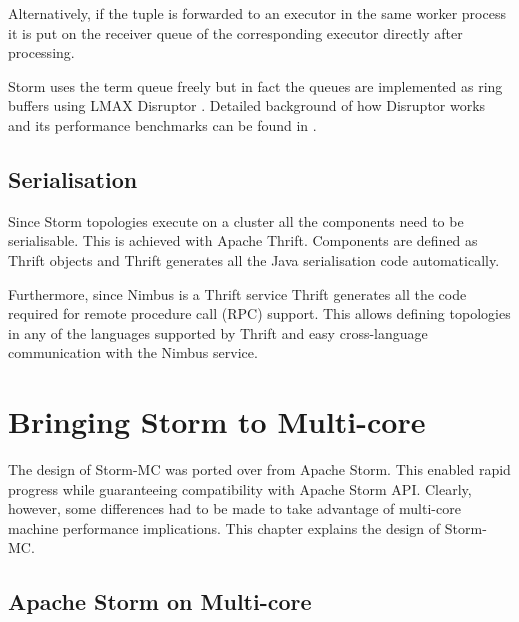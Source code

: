 \documentclass[bsc,logo,frontabs,twoside,singlespacing,normalheadings,parskip]{infthesis}     %
\let\Oldtodo\todo
\renewcommand{\todo}[1]{\Oldtodo[inline]{#1}}
\begin{document}
Alternatively, if the tuple is forwarded to an executor in the same worker process it is put on the receiver queue of the corresponding executor directly after processing.

Storm uses the term queue freely but in fact the queues are implemented as ring buffers using LMAX Disruptor \cite{LMAX_Disruptor}. Detailed background of how Disruptor works and its performance benchmarks can be found in \cite{Thompson_Farley_Barker_Gee_Stewart_2011}.

\section{Serialisation}
\label{sec:serialisation}

Since Storm topologies execute on a cluster all the components need to be serialisable. This is achieved with Apache Thrift. Components are defined as Thrift objects and Thrift generates all the Java serialisation code automatically.

\todo{Why is Thrift good?}

Furthermore, since Nimbus is a Thrift service Thrift generates all the code required for remote procedure call (RPC) support. This allows defining topologies in any of the languages supported by Thrift and easy cross-language communication with the Nimbus service.




\chapter{Bringing Storm to Multi-core}



The design of Storm-MC was ported over from Apache Storm. This enabled rapid progress while guaranteeing compatibility with Apache Storm API. Clearly, however, some differences had to be made to take advantage of multi-core machine performance implications. This chapter explains the design of Storm-MC.

\section{Apache Storm on Multi-core}
\end{document}
